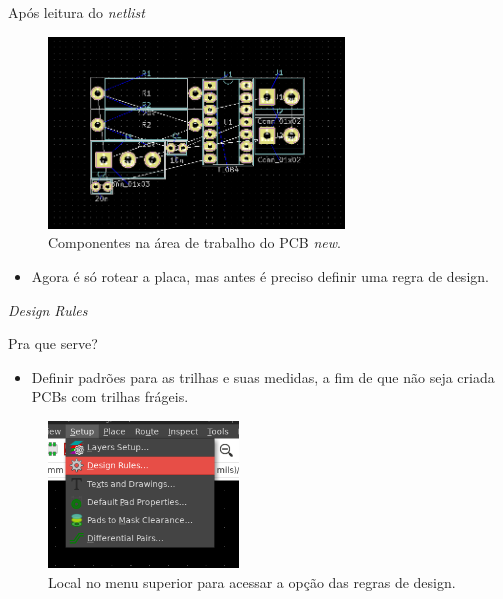 \documentclass{beamer}
\begin{document}
\begin{frame}{Após leitura do \textit{netlist}}
	\begin{figure}
		\centering
		\includegraphics[width=0.7\textwidth]{Imagens/28_componentes_board.png}
		\caption{Componentes na área de trabalho do PCB \textit{new}.}
	\end{figure}
	\pause
	\begin{itemize}
		\item Agora é só rotear a placa, mas antes é preciso definir uma regra de design.
	\end{itemize}
\end{frame}

\begin{frame}{\textit{Design Rules}}
	\begin{block}{Pra que serve?}
		\begin{itemize}
			\item Definir padrões para as trilhas e suas medidas, a fim de que não seja criada PCBs com trilhas frágeis.
		\end{itemize}
	\end{block}
	\begin{figure}
		\centering
		\includegraphics[width=0.45\textwidth]{Imagens/30_design_rules.png}
		\caption{Local no menu superior para acessar a opção das regras de design.}
	\end{figure}
\end{frame}
\end{document}

